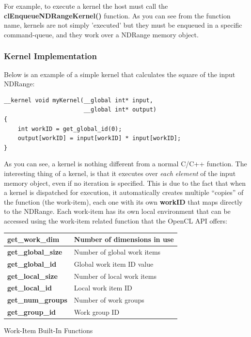 \begin{CLCode}
For example, to execute a kernel the host must call the \textbf{clEnqueueNDRangeKernel()} function. As you can see from the function name, kernels are not simply 'executed' but they must be enqueued in a specific command-queue, and they work over a NDRange memory object.
\end{CLCode}

\subsubsection{Kernel Implementation} \label{sect:kernelImplementation}
Below is an example of a simple kernel that calculates the square of the input NDRange:

{\footnotesize\begin{verbatim}
__kernel void myKernel(__global int* input,
                       __global int* output)
{
    int workID = get_global_id(0);
    output[workID] = input[workID] * input[workID];
}\end{verbatim}}

As you can see, a kernel is nothing different from a normal C/C++ function. The interesting thing of a kernel, is that it executes over \emph{each element} of the input memory object, even if no iteration is specified. This is due to the fact that when a kernel is dispatched for execution, it automatically creates multiple ``copies'' of the function (the work-item), each one with its own \textbf{workID} that maps directly to the NDRange. Each work-item has its own local environment that can be accessed using the work-item related function that the OpenCL API offers:\\

\begin{tablehere}
{\footnotesize
\begin{tabular}{|p{}|p{}|}\hline
\textbf{get\_work\_dim} & Number of dimensions in use\\ \hline
\textbf{get\_global\_size} & Number of global work items\\ \hline
\textbf{get\_global\_id} & Global work item ID value\\ \hline
\textbf{get\_local\_size} & Number of local work items\\ \hline
\textbf{get\_local\_id} & Local work item ID\\ \hline
\textbf{get\_num\_groups} & Number of work groups\\ \hline
\textbf{get\_group\_id} & Work group ID\\ \hline
\end{tabular}}
  \caption{Work-Item Built-In Functions\\}
	\label{tab:workItemFunctions}
\end{tablehere}


